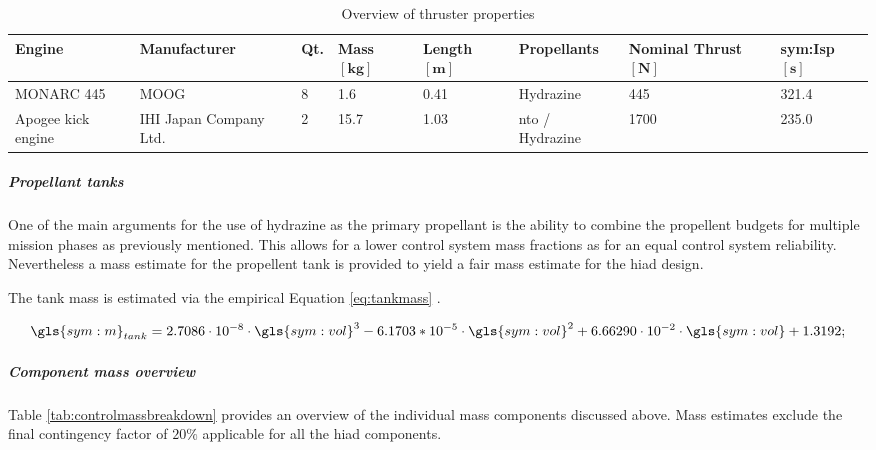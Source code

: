 \begin{table}[h]
	\centering
\caption{Overview of thruster properties}
\label{tab:thrusters}
\hspace{-5mm}
\begin{tabular}{|p{}|p{}|p{}|p{}|p{}|p{}|p{}|l|} \hline 
\textbf{Engine    }          &\textbf{ Manufacturer }         & \textbf{Qt.} &\textbf{Mass $\mathbf{[kg]}$}      & \textbf{Length $\mathbf{[m]}$} & \textbf{Propellants}  & \textbf{Nominal Thrust $\mathbf{[N]}$} & \textbf{\gls{sym:Isp} $\mathbf{[s]}$} \\ \hline \hline
MONARC 445          & MOOG                  & 8        & 1.6  & 0.41 & Hydrazine     & 445         & 321.4   \\ \hline
Apogee kick engine & IHI Japan Company Ltd. & 2        & 15.7 & 1.03 & \gls{nto} / Hydrazine & 1700        & 235.0     \\ \hline
\end{tabular}
\end{table}


\subparagraph{Propellant tanks}
One of the main arguments for the use of hydrazine as the primary propellant is the ability to combine the propellent budgets for multiple mission phases as previously mentioned. This allows for a lower control system mass fractions as for an equal control system reliability. Nevertheless a mass estimate for the propellent tank is provided to yield a fair mass estimate for the \gls{hiad} design. 

The tank mass is estimated via the empirical Equation \ref{eq:tankmass} \cite[p. 543]{Wertz2011}.

\begin{equation}
\label{eq:tankmass} 
\gls{sym:m}_{tank}=2.7086 \cdot 10^{-8} \cdot \gls{sym:vol}^3 -6.1703*10^{-5} \cdot \gls{sym:vol}^2 +6.66290 \cdot 10^{-2}  \cdot \gls{sym:vol} +1.3192;
\end{equation}

\subparagraph{Component mass overview}

Table \ref{tab:controlmassbreakdown} provides an overview of the individual mass components discussed above. Mass estimates exclude the final contingency factor of $20\%$ applicable for all the \gls{hiad} components.


